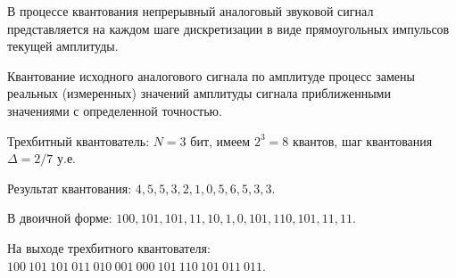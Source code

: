 \documentclass{beamer}
\begin{document}
\begin{frame}
В процессе квантования непрерывный аналоговый звуковой сигнал представляется на каждом шаге дискретизации в виде прямоугольных импульсов текущей амплитуды. 
\begin{block}{Квантование исходного аналогового сигнала по амплитуде}
процесс замены реальных (измеренных) значений амплитуды сигнала приближенными значениями с определенной точностью. 
\end{block}
\end{frame}

\begin{frame}
Трехбитный квантователь: $N=3$ бит, имеем $2^3=8$ квантов, шаг квантования $\Delta = 2/7$ у.е.

Результат квантования: \(4, 5, 5, 3, 2, 1, 0, 5, 6, 5, 3, 3\).

В двоичной форме: \(100, 101, 101, 11, 10, 1, 0, 101, 110, 101, 11, 11\).

На выходе трехбитного квантователя: \(100~101~101~011~010~001~000~101~110~101~011~011\).
\end{frame}
\end{document}
